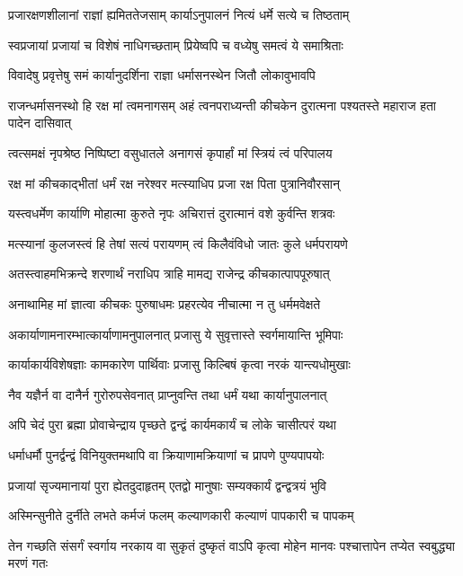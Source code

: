 \twolineshloka
{प्रजारक्षणशीलानां राज्ञां ह्यमिततेजसाम्}
{कार्याऽनुपालनं नित्यं धर्मे सत्ये च तिष्ठताम्}


\twolineshloka
{स्वप्रजायां प्रजायां च विशेषं नाधिगच्छताम्}
{प्रियेष्वपि च वध्येषु समत्वं ये समाश्रिताः}


\twolineshloka
{विवादेषु प्रवृत्तेषु समं कार्यानुदर्शिना}
{राज्ञा धर्मासनस्थेन जितौ लोकावुभावपि}


\onelineshloka
{राजन्धर्मासनस्थो हि रक्ष मां त्वमनागसम्}
\twolineshloka
{अहं त्वनपराध्यन्ती कीचकेन दुरात्मना}
{पश्यतस्ते महाराज हता पादेन दासिवात्}


\twolineshloka
{त्वत्समक्षं नृपश्रेष्ठ निष्पिष्टा वसुधातले}
{अनागसं कृपार्हां मां स्त्रियं त्वं परिपालय}


\twolineshloka
{रक्ष मां कीचकाद्भीतां धर्मं रक्ष नरेश्वर}
{मत्स्याधिप प्रजा रक्ष पिता पुत्रानिवौरसान्}


\twolineshloka
{यस्त्वधर्मेण कार्याणि मोहात्मा कुरुते नृपः}
{अचिरात्तं दुरात्मानं वशे कुर्वन्ति शत्रवः}


\twolineshloka
{मत्स्यानां कुलजस्त्वं हि तेषां सत्यं परायणम्}
{त्वं किलैवंविधो जातः कुले धर्मपरायणे}


\twolineshloka
{अतस्त्वाहमभिक्रन्दे शरणार्थं नराधिप}
{त्राहि मामद्य राजेन्द्र कीचकात्पापपूरुषात्}


\twolineshloka
{अनाथामिह मां ज्ञात्वा कीचकः पुरुषाधमः}
{प्रहरत्येव नीचात्मा न तु धर्ममवेक्षते}


\twolineshloka
{अकार्याणामनारम्भात्कार्याणामनुपालनात्}
{प्रजासु ये सुवृत्तास्ते स्वर्गमायान्ति भूमिपाः}


\twolineshloka
{कार्याकार्यविशेषज्ञाः कामकारेण पार्थिवाः}
{प्रजासु किल्बिषं कृत्वा नरकं यान्त्यधोमुखाः}


\twolineshloka
{नैव यज्ञैर्न वा दानैर्न गुरोरुपसेवनात्}
{प्राप्नुवन्ति तथा धर्मं यथा कार्यानुपालनात्}


\twolineshloka
{अपि चेदं पुरा ब्रह्मा प्रोवाचेन्द्राय पृच्छते}
{द्वन्द्वं कार्यमकार्यं च लोके चासीत्परं यथा}


\twolineshloka
{धर्माधर्मौ पुनर्द्वन्द्वं विनियुक्तमथापि वा}
{क्रियाणामक्रियाणां च प्रापणे पुण्यपापयोः}


\twolineshloka
{प्रजायां सृज्यमानायां पुरा ह्येतदुदाहृतम्}
{एतद्वो मानुषाः सम्यक्कार्यं द्वन्द्वत्रयं भुवि}


\twolineshloka
{अस्मिन्सुनीते दुर्नीते लभते कर्मजं फलम्}
{कल्याणकारी कल्याणं पापकारी च पापकम्}


\threelineshloka
{तेन गच्छति संसर्गं स्वर्गाय नरकाय वा}
{सुकृतं दुष्कृतं वाऽपि कृत्वा मोहेन मानवः}
{पश्चात्तापेन तप्येत स्वबुद्ध्या मरणं गतः}


